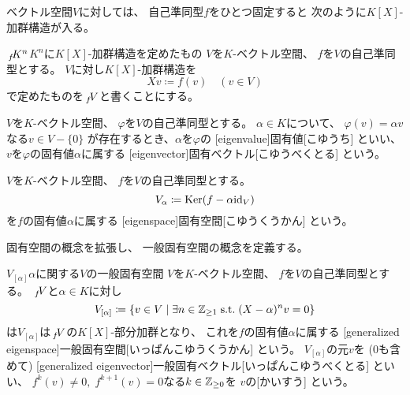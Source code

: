 \documentclass[report]{jlreq}
\begin{document}
ベクトル空間$V$に対しては、
自己準同型$f$をひとつ固定すると
次のように$K[X]$-加群構造が入る。

\begin{definition}
        {$\,{}_{f}\!K^n$}{$K^n$に$K[X]$-加群構造を定めたもの}
    $V$を$K$-ベクトル空間、
    $f$を$V$の自己準同型とする。
    $V$に対し$K[X]$-加群構造を
    \begin{equation}
        X v \coloneqq f(v)
            \quad (v \in V)
    \end{equation}
    で定めたものを$\,{}_{f}\!V$と書くことにする。
\end{definition}

\begin{definition}[固有値と固有ベクトル]
    $V$を$K$-ベクトル空間、
    $\varphi$を$V$の自己準同型とする。
    $\alpha \in K$について、
    $\varphi(v) = \alpha v$なる$v \in V - \{ 0 \}$
    が存在するとき、$\alpha$を$\varphi$の
    [eigenvalue]{固有値}[こゆうち]
    といい、
    $v$を$\varphi$の固有値$\alpha$に属する
    [eigenvector]{固有ベクトル}[こゆうべくとる]
    という。
\end{definition}

\begin{definition}[固有空間]
    $V$を$K$-ベクトル空間、
    $f$を$V$の自己準同型とする。
    \begin{equation}
        V_{\alpha} \coloneqq \operatorname{\mathrm{Ker}} (f - \alpha \mathrm{id}_V)
    \end{equation}
    を$f$の固有値$\alpha$に属する
    [eigenspace]{固有空間}[こゆうくうかん]
    という。
\end{definition}

固有空間の概念を拡張し、
一般固有空間の概念を定義する。

\begin{definition}[一般固有空間]
        {$V_{[\alpha]}$}{$\alpha$に関する$V$の一般固有空間}
    $V$を$K$-ベクトル空間、
    $f$を$V$の自己準同型とする。
    $\,{}_{f}\!V$と$\alpha \in K$に対し
    \begin{equation}
        V_{[\alpha]} \coloneqq \{
            v \in V
            \mid
            \exists n \in \mathbb{Z}_{\ge 1}
            \; \text{s.t.} \;
            (X - \alpha)^n v = 0
        \}
    \end{equation}
    は$V_{[\alpha]}$は$\,{}_{f}\!V$の$K[X]$-部分加群となり、
    これを$f$の固有値$\alpha$に属する
    [generalized eigenspace]{一般固有空間}[いっぱんこゆうくうかん]
    という。
    $V_{[\alpha]}$の元$v$を ($0$も含めて)
    [generalized eigenvector]{一般固有ベクトル}[いっぱんこゆうべくとる]
    といい、
    $f^k(v) \neq 0, \; f^{k + 1}(v) = 0$なる$k \in \mathbb{Z}_{\ge 0}$を
    $v$の[かいすう]
    という。
\end{definition}
\end{document}
